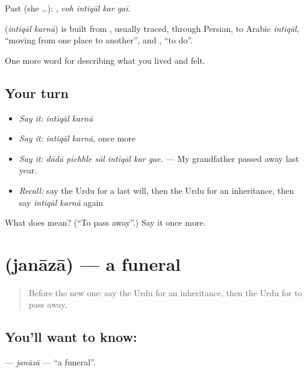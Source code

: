 Past (she …):    , \emph{voh intiqāl kar gaī}.

\begin{cousinweb}
\textbf{ } (\emph{intiqāl karnā}) is built from \textbf{}, usually traced, through Persian, to Arabic \emph{intiqāl}, \textquotedblleft{}moving from one place to another\textquotedblright{}, and \textbf{}, \textquotedblleft{}to do\textquotedblright{}.
\end{cousinweb}

\begin{grammarlens}[title={What you've built}]
One more word for describing what you lived and felt.
\end{grammarlens}

\subsection*{Your turn}
\begin{itemize}
\raggedright
  \item \emph{Say it:} \emph{intiqāl karnā}
  \item \emph{Say it:} \emph{intiqāl karnā}, once more
  \item \emph{Say it:} \emph{dādā pichhle sāl intiqāl kar gae.} — My grandfather passed away last year.
  \item \emph{Recall:} say the Urdu for a last will, then the Urdu for an inheritance, then say \emph{intiqāl karnā} again
\end{itemize}

\begin{tcolorbox}[breakable,colback=teal!4,colframe=teal!35!black,title={Before you move on}]
What does   mean? (\textquotedblleft{}To pass away\textquotedblright{}.) Say it once more.
\end{tcolorbox}
\section[\texorpdfstring{\ur{جنازہ} (janāzā)}{جنازہ (janāzā)}]{ (janāzā) — a funeral}

\label{lesson:UR-C493-janaza}



\begin{quote}
Before the new one: say the Urdu for an inheritance, then the Urdu for to pass away.
\end{quote}

\subsection*{You'll want to know: }
\textbf{} — \emph{janāzā} — \textquotedblleft{}a funeral\textquotedblright{}.

